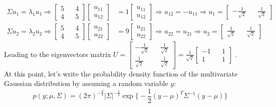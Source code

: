 \begin{align*}
    \Sigma u_1 = \lambda_1 u_1
    \Rightarrow
    \begin{bmatrix}
        5 && 4 \\
        4 && 5
    \end{bmatrix}
    \begin{bmatrix}
        u_{11} \\
        u_{12}
    \end{bmatrix}
    &=
    1
    \begin{bmatrix}
        u_{11} \\
        u_{12}
    \end{bmatrix}
    \Rightarrow
    u_{12}=-u_{11}
    \Rightarrow
    u_1=
    \begin{bmatrix}
        -\frac{1}{\sqrt{2}} && \frac{1}{\sqrt{2}}
    \end{bmatrix}
    \\
    \Sigma u_2 = \lambda_2 u_2
    \Rightarrow
    \begin{bmatrix}
        5 && 4 \\
        4 && 5
    \end{bmatrix}
    \begin{bmatrix}
        u_{21} \\
        u_{22}
    \end{bmatrix}
    &=
    9
    \begin{bmatrix}
        u_{21} \\
        u_{22}
    \end{bmatrix}
    \Rightarrow
    u_{22}=u_{21}
    \Rightarrow
    u_2=
    \begin{bmatrix}
        \frac{1}{\sqrt{2}} && \frac{1}{\sqrt{2}}
    \end{bmatrix}
\end{align*}
Leading to the eigenvectors matrix
\(
    U
    =
    \begin{bmatrix}
        -\frac{1}{\sqrt{2}} && \frac{1}{\sqrt{2}} \\
        \frac{1}{\sqrt{2}} && \frac{1}{\sqrt{2}}
    \end{bmatrix}
    =
    \frac{1}{\sqrt{2}}
    \begin{bmatrix}
        -1 && 1 \\
        1 && 1
    \end{bmatrix}
\)
.\\
At this point, let's write the probability density function of the multivariate
Gaussian distribution by assuming a random variable \(y\):
\[
    p(y;\mu,\Sigma)=(2\pi)^{-\frac{d}{2}}|\Sigma|^{-\frac{1}{2}}\exp{\biggl\{-\frac{1}{2}(y-\mu)^T\Sigma^{-1}(y-\mu)\biggr\}}
\]
